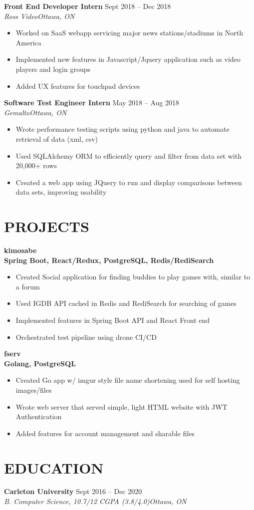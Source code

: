 \documentclass[letterpaper]{article}
\newcommand{\NewPart}[1]{\section*{\uppercase{\textbf{#1}}}}
\newcommand{\DatedEntry}[5]{\large\textbf{#1}
	\hfill #2\\\normalsize
	\textit{#3}\hfill\textit{#4}\\\vspace{0.10cm}
	#5
}
\newcommand{\ProjectEntry}[3]{\large\textbf{#1}
	\normalsize\\ \textbf{#2}\\\vspace{0.1cm}
	#3\vspace{0.10cm}
}
\begin{document}
\DatedEntry{Front End Developer Intern}
{Sept 2018 -- Dec 2018}
{Ross Video}
{Ottawa, ON}
{\begin{itemize}[nolistsep]
	\item Worked on SaaS webapp servicing major news stations/stadiums in North America
	\item Implemented new features in Javascript/Jquery application such as video players and login groups
	\item Added UX features for touchpad devices
\end{itemize}}
\DatedEntry{Software Test Engineer Intern}
{May 2018 -- Aug 2018}
{Gemalto}
{Ottawa, ON}
{\begin{itemize}[nolistsep]
	\item Wrote performance testing scripts using python and java to automate retrieval of data (xml, csv)
	\item Used SQLAlchemy ORM to efficiently query and filter from data set with 20,000+ rows
	\item Created a web app using JQuery to run and display comparisons between data sets, improving usability
\end{itemize}}

\NewPart{Projects}{}
\ProjectEntry{kimosabe}
{Spring Boot, React/Redux, PostgreSQL, Redis/RediSearch}
{\begin{itemize}
	\item Created Social application for finding buddies to play games with, similar to a forum
	\item Used IGDB API cached in Redis and RediSearch for searching of games
	\item Implemented features in Spring Boot API and React Front end
	\item Orchestrated test pipeline using drone CI/CD
\end{itemize}}
\ProjectEntry{fserv}
{Golang, PostgreSQL}
{\begin{itemize}
	\item Created Go app w/ imgur style file name shortening used for self hosting images/files
	\item Wrote web server that served simple, light HTML website with JWT Authentication
	\item Added features for account management and sharable files
\end{itemize}}

\NewPart{Education}{}
\DatedEntry{Carleton University}
{Sept 2016 -- Dec 2020}
{B. Computer Science, 10.7/12 CGPA (3.8/4.0)}
{Ottawa, ON}
\end{document}
